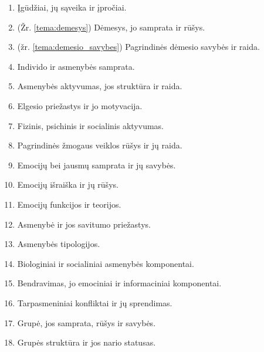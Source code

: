 \begin{enumerate}
  \item \label{tema_25} Įgūdžiai, jų sąveika ir įpročiai.
  \item \label{tema_26} (Žr. \ref{tema:demesys})
    Dėmesys, jo samprata ir rūšys.
  \item \label{tema_27} (žr. \ref{tema:demesio_savybes})
    Pagrindinės dėmesio savybės ir raida.
  \item \label{tema_30} Individo ir asmenybės samprata.
  \item \label{tema_31} Asmenybės aktyvumas, jos struktūra ir raida.
  \item \label{tema_32} Elgesio priežastys ir jo motyvacija.
  \item \label{tema_33} Fizinis, psichinis ir socialinis aktyvumas.
  \item \label{tema_34} Pagrindinės žmogaus veiklos rūšys ir jų raida.
  \item \label{tema_35} Emocijų bei jausmų samprata ir jų savybės.
  \item \label{tema_36} Emocijų išraiška ir jų rūšys.
  \item \label{tema_37} Emocijų funkcijos ir teorijos.
  \item \label{tema_40} Asmenybė ir jos savitumo priežastys.
  \item \label{tema_41} Asmenybės tipologijos.
  \item \label{tema_42} Biologiniai ir socialiniai asmenybės komponentai.
  \item \label{tema_43} Bendravimas, jo emociniai ir 
    informaciniai komponentai.
  \item \label{tema_44} Tarpasmeniniai konfliktai ir jų sprendimas.
  \item \label{tema_45} Grupė, jos samprata, rūšys ir savybės.
  \item \label{tema_46} Grupės struktūra ir jos nario statusas.
\end{enumerate}
